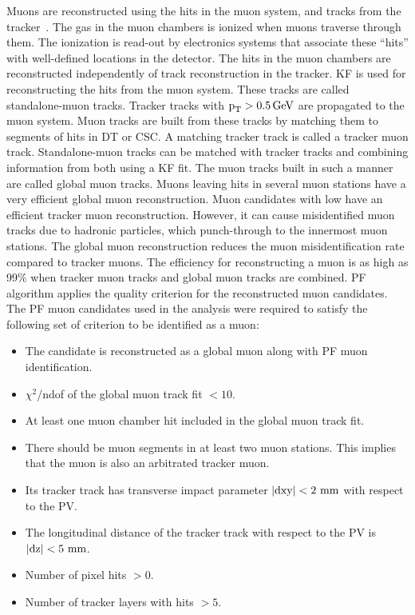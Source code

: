Muons are reconstructed using the hits in the muon system, and tracks from the tracker~\cite{Sirunyan:2018fpa}. The gas in the muon chambers is ionized when muons traverse through them. The ionization is read-out by electronics systems that associate these ``hits'' with well-defined locations in the detector. The hits in the muon chambers are reconstructed independently of track reconstruction in the tracker. KF is used for reconstructing the hits from the muon system. These tracks are called standalone-muon tracks. Tracker tracks with $\text{p}_\text{T} > 0.5 \,\text{Ge\hspace{-.08em}V}$ are propagated to the muon system. Muon tracks are built from these tracks by matching them to segments of hits in DT or CSC. A matching tracker track is called a tracker muon track. Standalone-muon tracks can be matched with tracker tracks and combining information from both using a KF fit. The muon tracks built in such a manner are called global muon tracks. Muons leaving hits in several muon stations have a very efficient global muon reconstruction. Muon candidates with low \pt have an efficient tracker muon reconstruction. However, it can cause misidentified muon tracks due to hadronic particles, which punch-through to the innermost muon stations. The global muon reconstruction reduces the muon misidentification rate compared to tracker muons. The efficiency for reconstructing a muon is as high as 99\% when tracker muon tracks and global muon tracks are combined. PF algorithm applies the quality criterion for the reconstructed muon candidates. The PF muon candidates used in the analysis were required to satisfy the following set of criterion to be identified as a muon:

\begin{itemize}
  \item The candidate is reconstructed as a global muon along with PF muon identification.
  \item $\chi^{2}$/ndof of the global muon track fit $< 10$.
  \item At least one muon chamber hit included in the global muon track fit.
  \item There should be muon segments in at least two muon stations. This implies that the muon is also an arbitrated tracker muon.
  \item Its tracker track has transverse impact parameter $|\text{dxy}| < 2~\text{mm}$ with respect to the PV.
  \item The longitudinal distance of the tracker track with respect to the PV is $|\text{dz}| < 5~\text{mm}$.
  \item Number of pixel hits $> 0$.
  \item Number of tracker layers with hits $> 5$.
\end{itemize}

